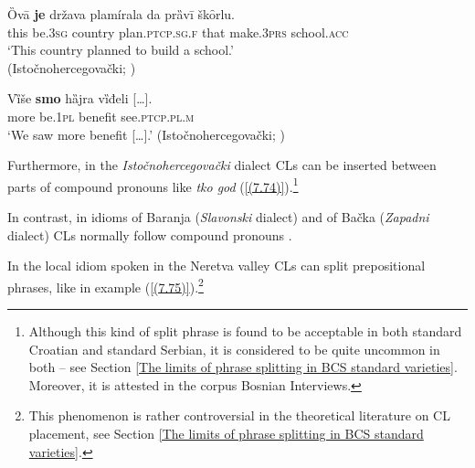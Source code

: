 \begin{exe}\ex\label{(7.72)}
\gll Ȍvā  \textbf{je}  država  plamírala  da  prȁvī  škȏrlu.   \\
this be.3\textsc{sg} country plan.\textsc{ptcp.sg.f} that  make.3\textsc{prs}  school.\textsc{acc}  \\
\glt ‘This country planned to build a school.’ \\
\hfill  (Istočnohercegovački; \citealt[283]{Peco07a})

\ex\label{(7.73)}
\gll Vȉše  \textbf{smo}  hȁjra  {vȉđeli [\dots].} \\
more be.1\textsc{pl}  benefit see.\textsc{ptcp.pl.m} \\
\glt ‘We saw more benefit [\dots].’
\hfill  (Istočnohercegovački; \citealt[283]{Peco07a})
\end{exe}

\noindent Furthermore, in the \textit{Istočnohercegovački} dialect CLs can be inserted between parts of compound pronouns like \textit{tko god} (\ref{(7.74)}).\footnote{Although this kind of split phrase is found to be acceptable in both standard Croatian and standard Serbian, it is considered to be quite uncommon in both – see Section \ref{The limits of phrase splitting in BCS standard varieties}. Moreover, it is attested in the corpus Bosnian Interviews.}


\noindent In contrast, in idioms of Baranja (\textit{Slavonski} dialect) and of Bačka (\textit{Zapadni} dialect) CLs normally follow compound pronouns \citep[cf.][340, 413]{Sekeres77}.

In the local idiom spoken in the Neretva valley CLs can split prepositional phrases, like in example (\ref{(7.75)}).\footnote{This phenomenon is rather controversial in the theoretical literature on CL placement, see Section \ref{The limits of phrase splitting in BCS standard varieties}.}  


